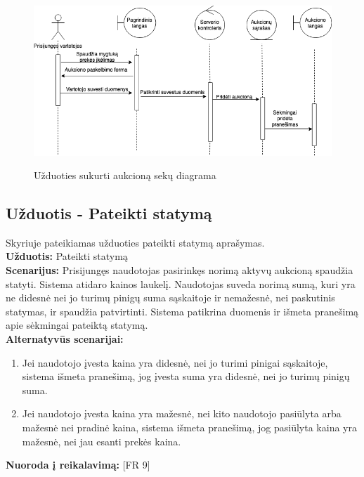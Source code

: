 \documentclass{VUMIFPSkursinis}
\begin{document}
	
		\begin{figure}[H]
		\centering
		\includegraphics[width=\linewidth]{img/addAuctionSequence.png}
		\label{fig:sukurti}
		\caption{Užduoties sukurti aukcioną sekų diagrama}
	\end{figure}

	\subsection{Užduotis - Pateikti statymą}
	Skyriuje pateikiamas užduoties pateikti statymą aprašymas.\\
	\textbf{Užduotis:}  Pateikti statymą \\
	\textbf{Scenarijus:}  Prisijungęs naudotojas pasirinkęs norimą aktyvų aukcioną spaudžia statyti. Sistema atidaro kainos laukelį. Naudotojas suveda norimą sumą, kuri yra ne didesnė nei jo turimų pinigų suma sąskaitoje ir nemažesnė, nei paskutinis statymas, ir spaudžia patvirtinti. Sistema patikrina duomenis ir išmeta pranešimą apie sėkmingai pateiktą statymą. \\
	\textbf{Alternatyvūs scenarijai:}
	\begin{enumerate}
		\item Jei naudotojo įvesta kaina yra didesnė, nei jo turimi pinigai sąskaitoje, sistema išmeta pranešimą, jog įvesta suma yra didesnė, nei jo turimų pinigų suma.
		\item Jei naudotojo įvesta kaina yra mažesnė, nei kito naudotojo pasiūlyta arba mažesnė nei pradinė kaina, sistema išmeta pranešimą, jog pasiūlyta kaina yra mažesnė, nei jau esanti prekės kaina.
	\end{enumerate}
	\textbf{Nuoroda į reikalavimą: } [FR 9]
	
\end{document}
